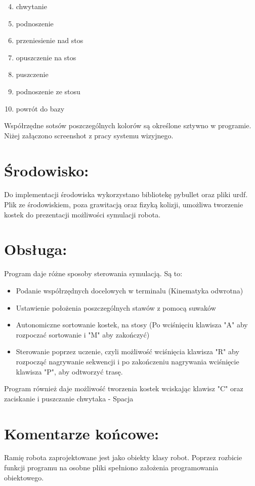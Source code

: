 \documentclass[12pt, a4paper]{article}
\begin{document}
\begin{enumerate}[label=\alph*., noitemsep, topsep=0pt]
    \setcounter{enumi}{3} %
    \item chwytanie
    \item podnoszenie
    \item przeniesienie nad stos
    \item opuszczenie na stos
    \item puszczenie
    \item podnoszenie ze stosu
    \item powrót do bazy
\end{enumerate}

Współrzędne sotsów poszczególnych kolorów są określone sztywno w programie. Niżej załączono screenshot z pracy systemu wizyjnego.


\section{Środowisko:}
Do implementacji środowiska wykorzystano bibliotekę pybullet oraz pliki urdf. Plik ze środowiskiem, poza grawitacją oraz fizyką kolizji, umożliwa tworzenie kostek do prezentacji możliwości symulacji robota.


\section{Obsługa:}
Program daje różne sposoby sterowania symulacją. Są to:
\begin{itemize}
    \item Podanie współrzędnych docelowych w terminalu (Kinematyka odwrotna)
    \item Ustawienie położenia poszczególnych stawów z pomocą suwaków
    \item Autonomiczne sortowanie kostek, na stosy (Po wciśnięciu klawisza "A" aby rozpoczać sortowanie i "M" aby zakończyć)
    \item Sterowanie poprzez uczenie, czyli możliwość wciśnięcia klawisza "R" aby rozpocząć nagrywanie sekwencji i po zakończeniu nagrywania wciśnięcie klawisza "P", aby odtworzyć trasę.
\end{itemize}

Program również daje możliwość tworzenia kostek wciskając klawisz "C" oraz zaciskanie i puszczanie chwytaka - Spacja

\section{Komentarze końcowe:}
Ramię robota zaprojektowane jest jako obiekty klasy robot. Poprzez rozbicie funkcji programu na osobne pliki spełniono założenia programowania obiektowego.
\end{document}
